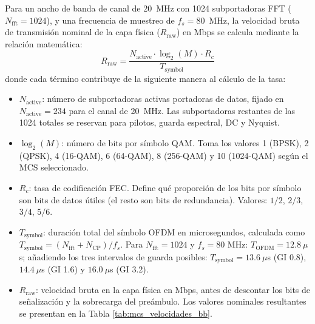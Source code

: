 Para un ancho de banda de canal de 20~MHz con 1024 subportadoras FFT ($N_{\text{fft}} = 1024$), y una frecuencia de muestreo de $f_s = 80$~MHz, la velocidad bruta de transmisión nominal de la capa física ($R_{\text{raw}}$) en Mbps se calcula mediante la relación matemática:
\begin{equation}
	R_{\text{raw}} = \frac{N_{\text{active}} \cdot \log_2(M) \cdot R_c}{T_{\text{symbol}}}
	\label{eq:phy_rate_calc}
\end{equation}
donde cada término contribuye de la siguiente manera al cálculo de la tasa:
\begin{itemize}
\item $N_{\text{active}}$: número de subportadoras activas portadoras de datos, fijado en $N_{\text{active}} = 234$ para el canal de 20~MHz. Las subportadoras restantes de las 1024 totales se reservan para pilotos, guarda espectral, DC y Nyquist.
\item $\log_2(M)$: número de bits por símbolo QAM. Toma los valores 1 (BPSK), 2 (QPSK), 4 (16-QAM), 6 (64-QAM), 8 (256-QAM) y 10 (1024-QAM) según el MCS seleccionado.
\item $R_c$: tasa de codificación FEC. Define qué proporción de los bits por símbolo son bits de datos útiles (el resto son bits de redundancia). Valores: $1/2$, $2/3$, $3/4$, $5/6$.
\item $T_{\text{symbol}}$: duración total del símbolo OFDM en microsegundos, calculada como $T_{\text{symbol}} = (N_{\text{fft}} + N_{\text{CP}}) / f_s$. Para $N_{\text{fft}} = 1024$ y $f_s = 80\text{ MHz}$: $T_{\text{OFDM}} = 12.8~\mu$s; añadiendo los tres intervalos de guarda posibles: $T_{\text{symbol}} = 13.6~\mu$s (GI 0.8), $14.4~\mu$s (GI 1.6) y $16.0~\mu$s (GI 3.2).
\item $R_{\text{raw}}$: velocidad bruta en la capa física en Mbps, antes de descontar los bits de señalización y la sobrecarga del preámbulo. Los valores nominales resultantes se presentan en la Tabla \ref{tab:mcs_velocidades_bb}.
\end{itemize}


